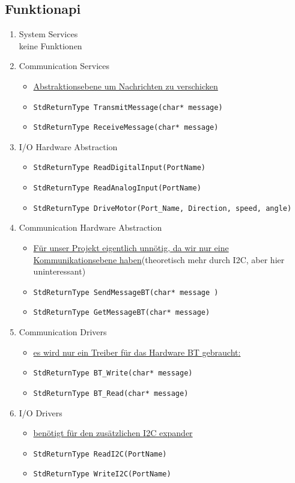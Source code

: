 \documentclass[a4paper,11pt]{scrreprt}
\begin{document}
\subsection{Funktionapi}
\begin{enumerate}[1.)]
\item System Services\\
	keine Funktionen
\item Communication Services
	\begin{itemize}
	\item \underline{Abstraktionsebene um Nachrichten zu verschicken}
	\item \lstinline|StdReturnType TransmitMessage(char* message)|
	\item \lstinline|StdReturnType ReceiveMessage(char* message)|
	\end{itemize}
\item I/O Hardware Abstraction
	\begin{itemize}
	\item \lstinline|StdReturnType ReadDigitalInput(PortName)|
	\item \lstinline|StdReturnType ReadAnalogInput(PortName)|
	\item \lstinline|StdReturnType DriveMotor(Port_Name, Direction, speed, angle)|
	\end{itemize}
\item Communication Hardware Abstraction
	\begin{itemize}
	\item \underline{Für unser Projekt eigentlich unnötig, da wir nur eine Kommunikationsebene haben}(theoretisch mehr durch I2C, aber hier uninteressant)
	\item \lstinline|StdReturnType SendMessageBT(char* message )|
	\item \lstinline|StdReturnType GetMessageBT(char* message)|
	\end{itemize}
\item Communication Drivers
	\begin{itemize}
	\item \underline{es wird nur ein Treiber für das Hardware BT gebraucht:}
	\item \lstinline|StdReturnType BT_Write(char* message)| 
	\item \lstinline|StdReturnType BT_Read(char* message)|
	\end{itemize}
\item I/O Drivers
	\begin{itemize}
	\item \underline{benötigt für den zusätzlichen I2C expander}
	\item \lstinline|StdReturnType ReadI2C(PortName)|
	\item \lstinline|StdReturnType WriteI2C(PortName)|	
	\end{itemize}
\end{enumerate}
\end{document}
